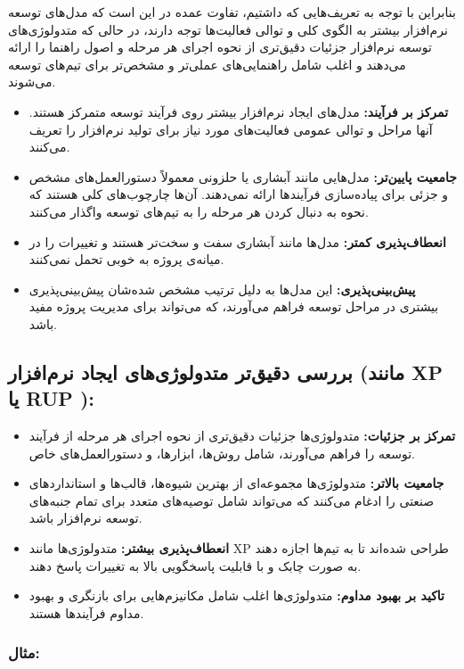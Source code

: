 بنابراین با توجه به تعریف‌هایی که داشتیم، تفاوت عمده در این است که مدل‌های توسعه نرم‌افزار بیشتر به الگوی کلی و توالی فعالیت‌ها توجه دارند، در حالی که متدولوژی‌های توسعه نرم‌افزار جزئیات دقیق‌تری از نحوه اجرای هر مرحله و اصول راهنما را ارائه می‌دهند و اغلب شامل راهنمایی‌های عملی‌تر و مشخص‌تر برای تیم‌های توسعه می‌شوند.

\begin{itemize}
	\item \textbf{تمرکز بر فرآیند:} مدل‌های ایجاد نرم‌افزار بیشتر روی فرآیند توسعه متمرکز هستند. آنها مراحل و توالی عمومی فعالیت‌های مورد نیاز برای تولید نرم‌افزار را تعریف می‌کنند.
	\item \textbf{جامعیت پایین‌تر:} مدل‌هایی مانند آبشاری یا حلزونی معمولاً دستورالعمل‌های مشخص و جزئی برای پیاده‌سازی فرآیندها ارائه نمی‌دهند. آن‌ها چارچوب‌های کلی هستند که نحوه به دنبال کردن هر مرحله را به تیم‌های توسعه واگذار می‌کنند.
	\item \textbf{انعطاف‌پذیری کمتر:} مدل‌ها مانند آبشاری سفت و سخت‌تر هستند و تغییرات را در میانه‌ی پروژه به خوبی تحمل نمی‌کنند.
	\item \textbf{پیش‌بینی‌پذیری:} این مدل‌ها به دلیل ترتیب مشخص شده‌شان پیش‌بینی‌پذیری بیشتری در مراحل توسعه فراهم می‌آورند، که می‌تواند برای مدیریت پروژه مفید باشد.
\end{itemize}

\subsection*{بررسی دقیق‌تر متدولوژی‌های ایجاد نرم‌افزار (مانند XP یا RUP ):}

\begin{itemize}
	\item \textbf{تمرکز بر جزئیات:} متدولوژی‌ها جزئیات دقیق‌تری از نحوه اجرای هر مرحله از فرآیند توسعه را فراهم می‌آورند، شامل روش‌ها، ابزارها، و دستورالعمل‌های خاص.
	\item \textbf{جامعیت بالاتر:} متدولوژی‌ها مجموعه‌ای از بهترین شیوه‌ها، قالب‌ها و استانداردهای صنعتی را ادغام می‌کنند که می‌تواند شامل توصیه‌های متعدد برای تمام جنبه‌های توسعه نرم‌افزار باشد.
	\item \textbf{انعطاف‌پذیری بیشتر:} متدولوژی‌ها مانند XP طراحی شده‌اند تا به تیم‌ها اجازه دهند به صورت چابک و با قابلیت پاسخگویی بالا به تغییرات پاسخ دهند.
	\item \textbf{تاکید بر بهبود مداوم:} متدولوژی‌ها اغلب شامل مکانیزم‌هایی برای بازنگری و بهبود مداوم فرآیندها هستند.
\end{itemize}

\subsubsection*{مثال:}


